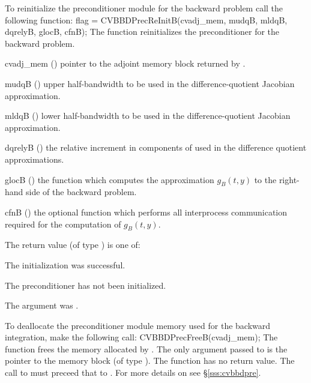 {}
To reinitialize the {\cvbbdpre} preconditioner module for the backward problem
call the following function:
{
  flag = CVBBDPrecReInitB(cvadj\_mem, mudqB, mldqB, dqrelyB, glocB, cfnB);
}
{
  The function  reinitializes the {\cvbbdpre} preconditioner
  for the backward problem.
}
{
  \begin{args}
  \item[cvadj\_mem] ()
    pointer to the adjoint memory block returned by .
  \item[mudqB] ()
    upper half-bandwidth to be used in the difference-quotient Jacobian approximation.
  \item[mldqB] ()
    lower half-bandwidth to be used in the difference-quotient Jacobian approximation.
  \item[dqrelyB] ()
    the relative increment in components of  used in the difference quotient
    approximations.
  \item[glocB] ()
    the {\C} function which computes the approximation $g_B(t,y)$  to the right-hand
    side of the backward problem. 
  \item[cfnB] ()
    the optional {\C} function which performs all interprocess communication required for
    the computation of $g_B(t,y)$.
  \end{args}
}
{
  The return value  (of type ) is one of:
  \begin{args}
  \item[\Id{CVBBDPRE\_SUCCESS}] 
    The {\cvbbdpre} initialization was successful.
  \item[\Id{CVBBDPRE\_PDATA\_NULL}]
    The {\cvbbdpre} preconditioner has not been initialized.
  \item[\Id{CVBBDPRE\_ADJMEM\_NULL}]
    The  argument was .
  \end{args}
}
{}
To deallocate the {\cvbbdpre} preconditioner module memory used for the
backward integration, make the following call:
{
  CVBBDPrecFreeB(cvadj\_mem);
}
{
  The function  frees the memory allocated by
  .
}
{
  The only argument passed to  is the pointer to the {\cvodea} 
  memory block (of type ).
}
{
  The function  has no return value.
}
{
  The call to  must preceed that to .
}
For more details on {\cvbbdpre} see \S\ref{sss:cvbbdpre}.

